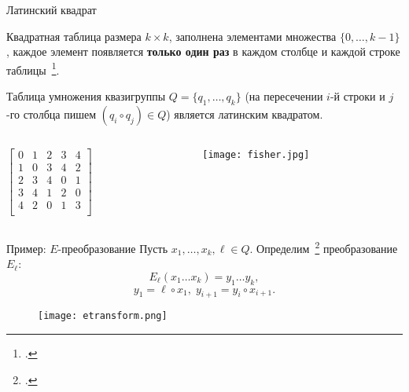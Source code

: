 \begin{frame}{Латинский квадрат}
    \begin{coloritemize}
        \item Квадратная таблица размера $k \times k$, заполнена элементами множества $\{ 0, \ldots, k-1 \}$, каждое элемент появляется \textbf{только один раз} в каждом столбце и каждой строке таблицы~\footcite{keedwell}.
        \item Таблица умножения квазигруппы $Q = \{q_1, \ldots, q_k \}$ (на пересечении $i$-й строки и $j$-го столбца пишем $(q_i \circ q_j) \in Q$) является латинским квадратом.
    \end{coloritemize}

    \pause
    \begin{columns}[T] %
        \begin{column}{.2\textwidth}
                \(
                    \begin{bmatrix}
                        0 & 1 & 2 & 3 & 4 \\
                        1 & 0 & 3 & 4 & 2 \\
                        2 & 3 & 4 & 0 & 1 \\
                        3 & 4 & 1 & 2 & 0 \\
                        4 & 2 & 0 & 1 & 3 \\
                    \end{bmatrix}
                \)
        \end{column}%
        \hfill%
        \begin{column}{.4\textwidth}
            \begin{figure}[h]
                \centering 
                \texttt{[image: fisher.jpg]}
            \end{figure}
        \end{column}%
    \end{columns}
    
\end{frame}


\begin{frame}{Пример: $E$-преобразование}
    Пусть $x_1, \ldots, x_k, \ell \in Q$.
    Определим~\footcite{markovski2017quasigroup} преобразование $E_{\ell}$:
    \[
        E_{\ell}(x_1 \ldots x_k) = y_1 \ldots y_k,
    \]
    \pause
    \[
        y_1 = \ell \circ x_1, \; y_{i+1} = y_i \circ x_{i+1}.
    \]
    \begin{figure}[h]
        \centering 
        \texttt{[image: etransform.png]}
    \end{figure}
\end{frame}


